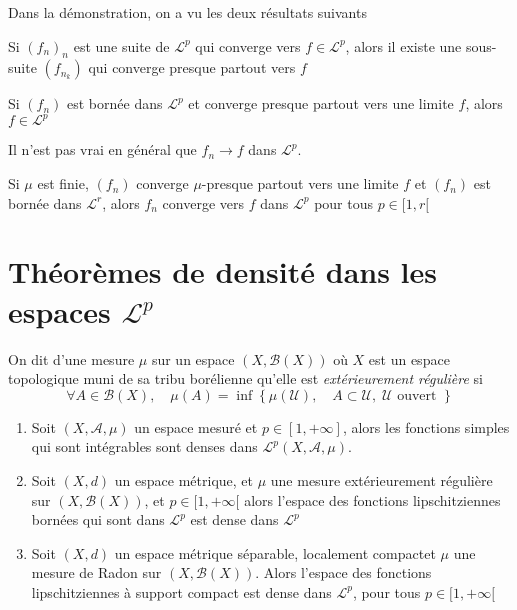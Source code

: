 \begin{rem}
Dans la démonstration, on a vu les deux résultats suivants
\end{rem}

\begin{thm}
    Si $(f_n)_n$ est une suite de $\mathcal  L^p$ qui converge vers $f \in  \mathcal  L^p$, alors il existe une sous-suite $(f_{n_{k}})$ qui converge presque partout vers $f$
\end{thm}

\begin{prop}
    Si $(f_n)$ est bornée dans  $\mathcal  L^p$ et converge presque partout vers une limite $f$, alors  $f \in \mathcal  L^p$
\end{prop}

\begin{rem}
Il n'est pas vrai en général que $f_n \longrightarrow f$ dans $\mathcal  L^p$.
\end{rem}

\begin{exo}
    Si $\mu$ est finie,  $(f_n)$ converge  $\mu$-presque partout vers une limite  $f$ et  $(f_n)$ est bornée dans  $ \mathcal  L^r$, alors $f_n$ converge vers  $f$ dans  $\mathcal  L^p$ pour tous $p \in  [1, r[$\footnotemark
\end{exo}


\section{Théorèmes de densité dans les espaces \texorpdfstring{$\mathcal L^p$}{L^p}}

\begin{dfn}
    On dit d'une mesure $\mu$ sur un espace  $(X, \mathcal  B(X))$ où $X$ est un espace topologique muni de sa tribu borélienne qu'elle est  \emph{extérieurement régulière} si \[
        \forall  A \in  \mathcal  B(X), \quad  \mu(A)= \inf \left\{ \mu(\mathcal  U), \quad  A\subset \mathcal  U, \;\mathcal  U\text{ ouvert } \right\} 
    \] 
\end{dfn}

\begin{thm}
\begin{enumerate}
    \item Soit $(X, \mathcal  A, \mu)$ un espace mesuré et $p \in  [1, +\infty]$, alors les fonctions simples qui sont intégrables sont denses dans $\mathcal  L^p(X, \mathcal  A, \mu)$.
    \item Soit $(X,d)$ un espace métrique, et  $\mu$ une mesure extérieurement régulière sur  $(X, \mathcal B(X))$, et $p \in  [1, +\infty[$ alors l'espace des fonctions lipschitziennes bornées qui sont dans $\mathcal  L^p$ est dense dans $\mathcal  L^p$
    \item Soit $(X, d)$ un espace métrique séparable, localement compact\footnotemark et  $\mu$ une mesure de Radon sur  $(X, \mathcal  B(X))$. Alors l'espace des fonctions lipschitziennes à support compact est dense dans $\mathcal  L^p$, pour tous $p \in  [1, +\infty[$
\end{enumerate}
\end{thm}

